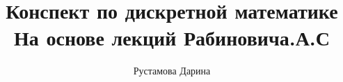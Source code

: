 \documentclass[12pt]{report}
\title{
    Конспект по дискретной математике \\ 
    \large На основе лекций Рабиновича.А.С}
\author{
    Рустамова Дарина
}
\date{\the\year}
\begin{document}
\maketitle
\tableofcontents

\newcommand\shortlorem{}

\newpage








\shortlorem
\end{document}
